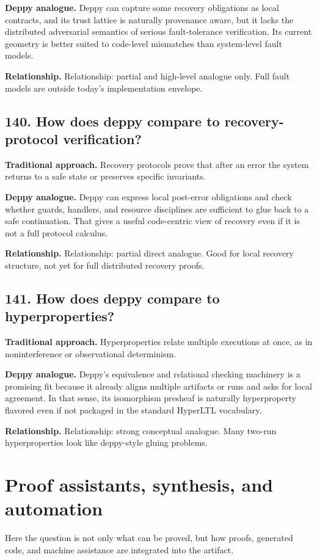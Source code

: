 \documentclass[11pt,openany]{book}
\begin{document}
\textbf{Deppy analogue.} Deppy can capture some recovery obligations as local contracts, and its trust lattice is naturally provenance aware, but it lacks the distributed adversarial semantics of serious fault-tolerance verification. Its current geometry is better suited to code-level mismatches than system-level fault models.

\textbf{Relationship.} Relationship: partial and high-level analogue only. Full fault models are outside today's implementation envelope.

\section*{140. How does deppy compare to recovery-protocol verification?}
\textbf{Traditional approach.} Recovery protocols prove that after an error the system returns to a safe state or preserves specific invariants.

\textbf{Deppy analogue.} Deppy can express local post-error obligations and check whether guards, handlers, and resource disciplines are sufficient to glue back to a safe continuation. That gives a useful code-centric view of recovery even if it is not a full protocol calculus.

\textbf{Relationship.} Relationship: partial direct analogue. Good for local recovery structure, not yet for full distributed recovery proofs.

\section*{141. How does deppy compare to hyperproperties?}
\textbf{Traditional approach.} Hyperproperties relate multiple executions at once, as in noninterference or observational determinism.

\textbf{Deppy analogue.} Deppy's equivalence and relational checking machinery is a promising fit because it already aligns multiple artifacts or runs and asks for local agreement. In that sense, its isomorphism presheaf is naturally hyperproperty flavored even if not packaged in the standard HyperLTL vocabulary.

\textbf{Relationship.} Relationship: strong conceptual analogue. Many two-run hyperproperties look like deppy-style gluing problems.

\chapter{Proof assistants, synthesis, and automation}
Here the question is not only what can be proved, but how proofs, generated code, and machine assistance are integrated into the artifact.
\end{document}
